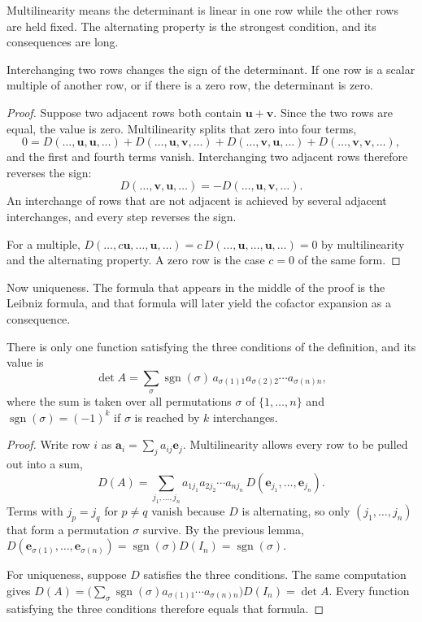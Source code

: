 Multilinearity means the determinant is linear in one row while the other rows are held fixed.
The alternating property is the strongest condition, and its consequences are long.

\begin{lemma}
Interchanging two rows changes the sign of the determinant. If one row is a scalar multiple of
another row, or if there is a zero row, the determinant is zero.
\end{lemma}

\begin{proof}
Suppose two adjacent rows both contain $\mathbf{u}+\mathbf{v}$. Since the two rows are equal,
the value is zero. Multilinearity splits that zero into four terms,
\[
  0=D(\dots,\mathbf{u},\mathbf{u},\dots)+D(\dots,\mathbf{u},\mathbf{v},\dots)
   +D(\dots,\mathbf{v},\mathbf{u},\dots)+D(\dots,\mathbf{v},\mathbf{v},\dots),
\]
and the first and fourth terms vanish. Interchanging two adjacent rows therefore reverses the
sign:
\[
  D(\dots,\mathbf{v},\mathbf{u},\dots)=-D(\dots,\mathbf{u},\mathbf{v},\dots).
\]
An interchange of rows that are not adjacent is achieved by several adjacent interchanges, and
every step reverses the sign.

For a multiple, $D(\dots,c\mathbf{u},\dots,\mathbf{u},\dots)
=c\,D(\dots,\mathbf{u},\dots,\mathbf{u},\dots)=0$ by multilinearity and the alternating
property. A zero row is the case $c=0$ of the same form.
\end{proof}

Now uniqueness. The formula that appears in the middle of the proof is the Leibniz formula, and
that formula will later yield the cofactor expansion as a consequence.

\begin{teorema}
There is only one function satisfying the three conditions of the definition, and its value is
\[
  \det A=\sum_{\sigma}\operatorname{sgn}(\sigma)\,
  a_{\sigma(1)1}a_{\sigma(2)2}\cdots a_{\sigma(n)n},
\]
where the sum is taken over all permutations $\sigma$ of $\{1,\dots,n\}$ and
$\operatorname{sgn}(\sigma)=(-1)^{k}$ if $\sigma$ is reached by $k$ interchanges.
\end{teorema}

\begin{proof}
Write row $i$ as $\mathbf{a}_{i}=\sum_{j}a_{ij}\mathbf{e}_{j}$. Multilinearity allows every row
to be pulled out into a sum,
\[
  D(A)=\sum_{j_{1},\dots,j_{n}}a_{1j_{1}}a_{2j_{2}}\cdots a_{nj_{n}}\,
  D(\mathbf{e}_{j_{1}},\dots,\mathbf{e}_{j_{n}}).
\]
Terms with $j_{p}=j_{q}$ for $p\neq q$ vanish because $D$ is alternating, so only
$(j_{1},\dots,j_{n})$ that form a permutation $\sigma$ survive. By the previous lemma,
$D(\mathbf{e}_{\sigma(1)},\dots,\mathbf{e}_{\sigma(n)})
=\operatorname{sgn}(\sigma)D(I_{n})=\operatorname{sgn}(\sigma)$.

For uniqueness, suppose $D$ satisfies the three conditions. The same computation gives
$D(A)=\bigl(\sum_{\sigma}\operatorname{sgn}(\sigma)a_{\sigma(1)1}\cdots
a_{\sigma(n)n}\bigr)D(I_{n})=\det A$. Every function satisfying the three conditions therefore
equals that formula.
\end{proof}

